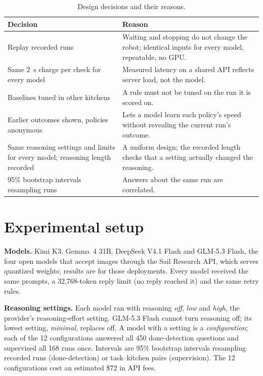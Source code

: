 \documentclass[10pt,twocolumn,letterpaper]{article}
\begin{document}
\begin{table}[t]
\centering\footnotesize
\setlength{\tabcolsep}{3pt}
\begin{tabular}{@{}p{}p{}@{}}
\toprule
\raggedright Decision & \raggedright Reason \tabularnewline
\midrule
\raggedright Replay recorded runs & \raggedright Waiting and stopping do not change the robot; identical inputs for every model, repeatable, no GPU. \tabularnewline
\raggedright Same 2~s charge per check for every model & \raggedright Measured latency on a shared API reflects server load, not the model. \tabularnewline
\raggedright Baselines tuned in other kitchens & \raggedright A rule must not be tuned on the run it is scored on. \tabularnewline
\raggedright Earlier outcomes shown, policies anonymous & \raggedright Lets a model learn each policy's speed without revealing the current run's outcome. \tabularnewline
\raggedright Same reasoning settings and limits for every model; reasoning length recorded & \raggedright A uniform design; the recorded length checks that a setting actually changed the reasoning. \tabularnewline
\raggedright 95\% bootstrap intervals resampling runs & \raggedright Answers about the same run are correlated. \tabularnewline
\bottomrule
\end{tabular}
\caption{Design decisions and their reasons.}
\label{tab:design}
\end{table}

\section{Experimental setup}
\textbf{Models.} Kimi K3, Gemma~4 31B, DeepSeek V4.1 Flash and GLM-5.3 Flash, the four open models that accept images
through the Sail Research API, which serves quantized weights; results are for those deployments. Every model received
the same prompts, a 32,768-token reply limit (no reply reached it) and the same retry rules.

\textbf{Reasoning settings.} Each model ran with reasoning \emph{off}, \emph{low} and \emph{high}, the provider's
reasoning-effort setting. GLM-5.3 Flash cannot turn reasoning off; its lowest setting, \emph{minimal}, replaces off.
A model with a setting is a \emph{configuration}; each of the 12 configurations answered all 450 done-detection
questions and supervised all 168 runs once. Intervals are 95\% bootstrap intervals resampling recorded runs
(done-detection) or task--kitchen pairs (supervision). The 12 configurations cost an estimated \$72 in API fees.
\end{document}
